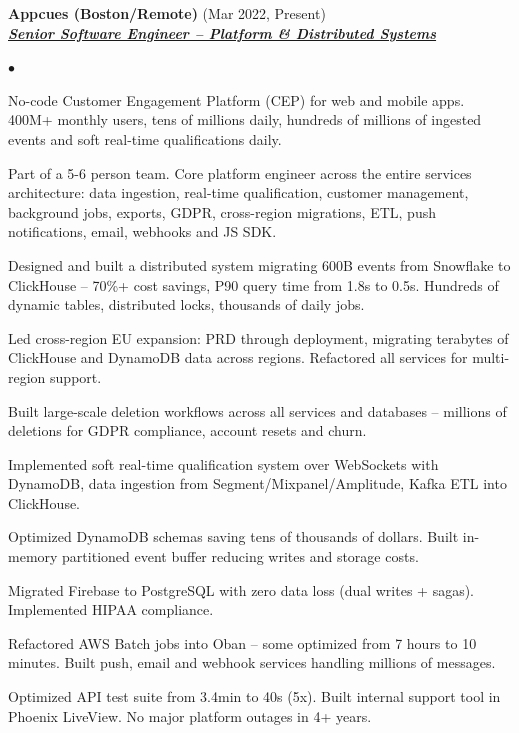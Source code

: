 \documentclass[a4paper]{article}
\newcommand{\employer}[3]{{
  \textbf{#1} (#2)\\ \underline{\textbf{\emph{#3}}}\\ }}
\newenvironment{achievements}{\begin{list}{$\bullet$}{\topsep 0pt \itemsep
  -2pt}}{\vspace*{4pt}\end{list}}
\begin{document}
  \employer{ Appcues (Boston/Remote)}{Mar 2022, Present}{Senior Software Engineer -- Platform \& Distributed Systems}
  \begin{achievements}
  \item No-code Customer Engagement Platform (CEP) for web and mobile apps. 400M+ monthly users, tens of millions daily, hundreds of millions of ingested events and soft real-time qualifications daily.
  \item Part of a 5-6 person team. Core platform engineer across the entire services architecture: data ingestion, real-time qualification, customer management, background jobs, exports, GDPR, cross-region migrations, ETL, push notifications, email, webhooks and JS SDK.
  \item Designed and built a distributed system migrating 600B events from Snowflake to ClickHouse -- 70\%+ cost savings, P90 query time from 1.8s to 0.5s. Hundreds of dynamic tables, distributed locks, thousands of daily jobs.
  \item Led cross-region EU expansion: PRD through deployment, migrating terabytes of ClickHouse and DynamoDB data across regions. Refactored all services for multi-region support.
  \item Built large-scale deletion workflows across all services and databases -- millions of deletions for GDPR compliance, account resets and churn.
  \item Implemented soft real-time qualification system over WebSockets with DynamoDB, data ingestion from Segment/Mixpanel/Amplitude, Kafka ETL into ClickHouse.
  \item Optimized DynamoDB schemas saving tens of thousands of dollars. Built in-memory partitioned event buffer reducing writes and storage costs.
  \item Migrated Firebase to PostgreSQL with zero data loss (dual writes + sagas). Implemented HIPAA compliance.
  \item Refactored AWS Batch jobs into Oban -- some optimized from 7 hours to 10 minutes. Built push, email and webhook services handling millions of messages.
  \item Optimized API test suite from 3.4min to 40s (5x). Built internal support tool in Phoenix LiveView. No major platform outages in 4+ years.
  \end{achievements}
\end{document}
